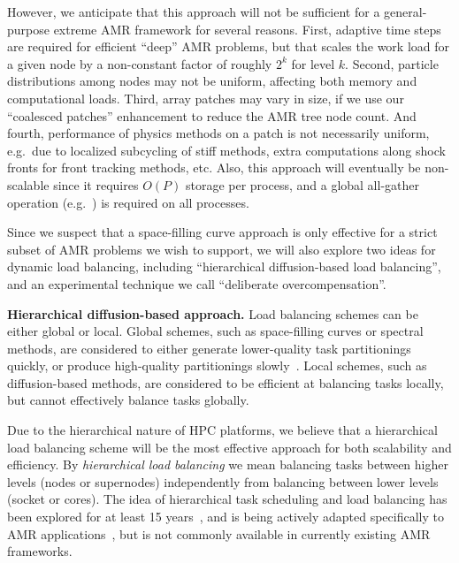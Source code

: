 \documentclass[10pt,twocolumn]{article}
\begin{document}
However, we anticipate that this approach will not be sufficient for a
general-purpose extreme AMR framework for several reasons.
%
First, adaptive time steps are required for efficient ``deep'' AMR
problems, but that scales the work load for a given node by a
non-constant factor of roughly $2^k$ for level $k$.
%
Second, particle distributions among nodes may not be uniform, affecting both memory and computational loads.
%
Third, array patches may vary in size, if we use our ``coalesced
patches'' enhancement to reduce the AMR tree node count.
%
And fourth, performance of physics methods on a patch is not
necessarily uniform, e.g.~due to localized subcycling of stiff
methods, extra computations along shock fronts for front tracking
methods, etc.  
%
Also, this approach will eventually be non-scalable since it
requires $O(P)$ storage per process, and a global all-gather
operation (e.g.~) is required on all processes.

Since we suspect that a space-filling curve approach is only effective
for a strict subset of AMR problems we wish to support, we will also
explore two ideas for dynamic load balancing, including ``hierarchical
diffusion-based load balancing'', and an experimental technique we
call ``deliberate overcompensation''.

\textbf{Hierarchical diffusion-based approach.} Load balancing
schemes can be either global or local.  Global schemes, such as
space-filling curves or spectral methods, are considered to either
generate lower-quality task partitionings quickly, or produce
high-quality partitionings slowly~\cite{ScKa97}.  Local schemes,
such as diffusion-based methods, are considered to be efficient
at balancing tasks locally, but cannot effectively balance tasks
globally.

Due to the hierarchical nature of HPC platforms, we believe that a
hierarchical load balancing scheme will be the most effective approach
for both scalability and efficiency.  By \textit{hierarchical load
  balancing} we mean balancing tasks between higher levels (nodes or
supernodes) independently from balancing between lower levels
(socket or cores).  The idea of hierarchical task scheduling and load
balancing has been explored for at least 15 years~\cite{AhGh94}, and
is being actively adapted specifically to AMR
applications~\cite{LaTa06}, but is not commonly available in currently
existing AMR frameworks.
\end{document}

